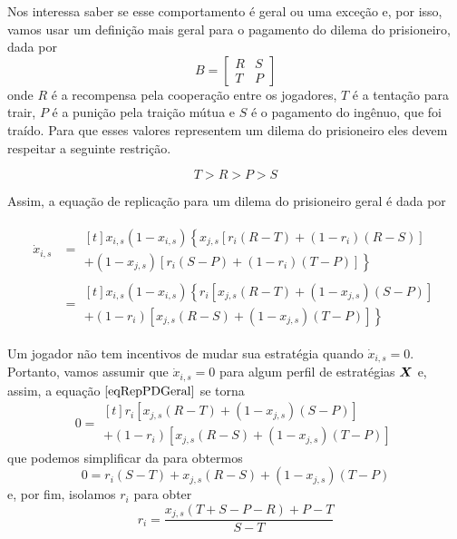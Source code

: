 Nos interessa saber se esse comportamento é geral ou uma exceção e, por isso, vamos usar um definição mais geral para o pagamento do dilema do prisioneiro, dada por
\begin{equation}
    \label{payoffGeralPD}
    B=
    \begin{bmatrix}
        R & S\\ 
        T & P 
    \end{bmatrix}
\end{equation}
onde $R$ é a recompensa pela cooperação entre os jogadores, $T$ é a tentação para trair, $P$ é a punição pela traição mútua e $S$ é o pagamento do ingênuo, que foi traído. Para que esses valores representem um dilema do prisioneiro eles devem respeitar a seguinte restrição.

\begin{equation}
    T>R>P>S
\end{equation}

Assim, a equação de replicação para um dilema do prisioneiro geral é dada por

\begin{equation}
\begin{split}
    \label{eqRepPDGeral}
    \dot{x}_{i,s}&= \!\begin{multlined}[t]
        x_{i,s}(1-x_{i,s})\left\{x_{j,s}\left[r_i(R-T)+(1-r_i)(R-S) \right] \right.\\
        + \left. (1-x_{j,s})\left[r_i(S-P)+(1-r_i)(T-P)\right] \right\}
    \end{multlined} \\
    &= \!\begin{multlined}[t]
    x_{i,s}(1-x_{i,s})\left\{r_i \left[x_{j,s}(R-T)+(1-x_{j,s})(S-P) \right] \right. \\
    + \left. (1-r_i)\left[ x_{j,s}(R-S) + (1-x_{j,s})(T-P)\right] \right\}
    \end{multlined}
\end{split}
\end{equation}

Um jogador não tem incentivos de mudar sua estratégia quando $\dot{x}_{i,s}=0$. Portanto, vamos assumir que $\dot{x}_{i,s}=0$ para algum perfil de estratégias $\boldsymbol{X}$ e, assim, a equação $\eqref{eqRepPDGeral}$ se torna
\begin{equation}
    0 = \!\begin{multlined}[t]
        r_i \left[x_{j,s}(R-T)+(1-x_{j,s})(S-P) \right] \\
    + (1-r_i)\left[ x_{j,s}(R-S) + (1-x_{j,s})(T-P)\right]
    \end{multlined}
\end{equation}
que podemos simplificar da para obtermos
\begin{equation}
    0 = r_i(S-T) + x_{j,s}(R-S) + (1-x_{j,s})(T-P)
\end{equation}
e, por fim, isolamos $r_i$ para obter
\begin{equation}
    \label{rSela}
    r_i=\frac{x_{j,s}(T+S-P-R)+P-T}{S-T}
\end{equation}

